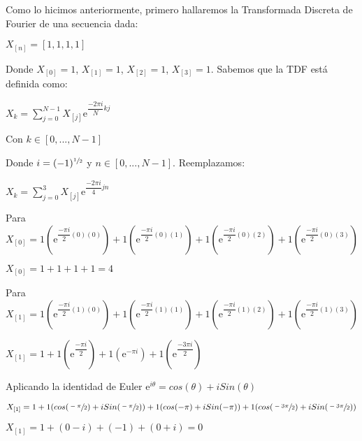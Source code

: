 \documentclass[a4paper]{article}
\begin{document}
Como lo hicimos anteriormente, primero hallaremos la Transformada Discreta de Fourier de una secuencia dada:

\begin{center}
$X_{[n]} = [1,1,1,1]$
\end{center}

Donde $X_{[0]} = 1$, $X_{[1]} = 1$, $X_{[2]} = 1$, $X_{[3]} = 1$. Sabemos que la TDF está definida como:

\begin{center}
$X_{k} = \sum \limits_{j=0}^{N - 1} X_{[j]} \mathrm{e}^{\dfrac{-2\pi i}{N} kj}$
\end{center}

\begin{center}
Con $k \in [0,...,N-1]$
\end{center}

Donde $i=(-1)^{\sfrac{1}{2}}$ y $n \in [0,...,N-1]$. Reemplazamos:

\begin{center}
$X_{k} = \sum \limits_{j=0}^{3} X_{[j]} \mathrm{e}^{\dfrac{-2\pi i}{4} jn}$
\end{center}

Para $X_{[0]} = 1(\mathrm{e}^{\dfrac{-\pi i}{2}(0)(0)}) + 1(\mathrm{e}^{\dfrac{-\pi i}{2}(0)(1)}) + 1(\mathrm{e}^{\dfrac{-\pi i}{2}(0)(2)}) + 1(\mathrm{e}^{\dfrac{-\pi i}{2}(0)(3)})$

\begin{center}
$X_{[0]} = 1 + 1 + 1 + 1 = 4$
\end{center}

Para $X_{[1]} = 1(\mathrm{e}^{\dfrac{-\pi i}{2}(1)(0)}) + 1(\mathrm{e}^{\dfrac{-\pi i}{2}(1)(1)}) + 1(\mathrm{e}^{\dfrac{-\pi i}{2}(1)(2)}) + 1(\mathrm{e}^{\dfrac{-\pi i}{2}(1)(3)})$

\begin{center}
$X_{[1]} = 1 + 1(\mathrm{e}^{\dfrac{-\pi i}{2}}) + 1(\mathrm{e}^{-\pi i}) + 1(\mathrm{e}^{\dfrac{-3\pi i}{2}})$
\end{center}

Aplicando la identidad de Euler $\mathrm{e}^{i \theta} = cos(\theta) + i Sin(\theta)$

\begin{center}
$X_{[1]} = 1 + 1(cos(\sfrac{-\pi}{2}) + i Sin(\sfrac{-\pi}{2})) + 1(cos(-\pi) + i Sin(-\pi)) + 1(cos(\sfrac{-3\pi}{2}) + i Sin(\sfrac{-3\pi}{2}))$
\end{center}

\begin{center}
$X_{[1]} = 1 + (0-i) + (-1) + (0+i) = 0$
\end{center}
\end{document}
